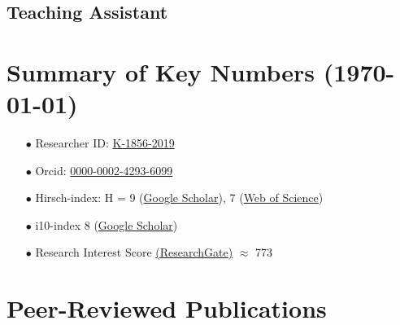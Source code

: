 \documentclass[11pt,a4paper,roman,english,colorlinks,linkcolor={red!50!black}]{moderncv}
\begin{document}
\subsection{Teaching Assistant}



\section{\textbf{Summary of Key Numbers (\today)}}
\begin{enumerate}[leftmargin=0.75cm]
	\item[$\bullet$] Researcher ID: \href{https://www.webofscience.com/wos/author/record/K-1856-2019}{K-1856-2019}
	\item[$\bullet$] Orcid: \href{https://orcid.org/0000-0002-4293-6099}{0000-0002-4293-6099}
	\item[$\bullet$] Hirsch-index: H = 9 (\href{https://scholar.google.com/citations?hl=en&user=67aQviYAAAAJ}{Google Scholar}), 7 (\href{https://www.webofscience.com/wos/author/record/K-1856-2019}{Web of Science})
	\item[$\bullet$] i10-index 8 (\href{https://scholar.google.com/citations?hl=en&user=67aQviYAAAAJ}{Google Scholar})
	\item[$\bullet$] Research Interest Score \href{https://www.researchgate.net/profile/Vatsal-Sanjay-2}{(ResearchGate)} $\approx$ 773
\end{enumerate}

\section{\textbf{Peer-Reviewed Publications}}
\end{document}

